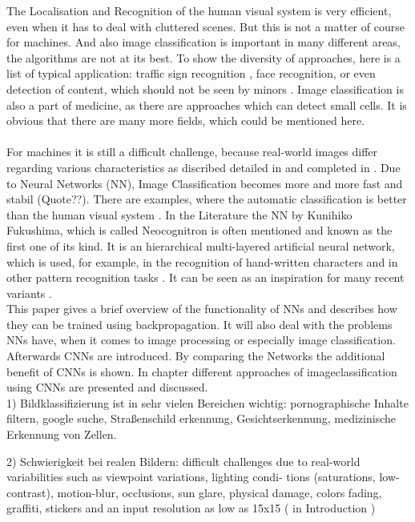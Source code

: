 \documentclass{sig-alternate-05-2015}
\begin{document}
The Localisation and Recognition of the human visual system is very efficient, even when it has to deal with cluttered scenes. But this is not a matter of course for machines. And also image classification is important in many different areas, the algorithms are not at its best. To show the diversity of approaches, here is a list of typical application: traffic sign recognition \cite{6033458}\cite{6033589}, face recognition, or even detection of  content, which should not be seen by minors \cite{7545022}. Image classification is also a part of medicine, as there are approaches which can detect small cells. It is obvious that there are many more fields, which could be mentioned here. \\\\
For machines it is still a difficult challenge, because real-world images differ regarding various characteristics as discribed detailed in \cite{6033589} and completed in \cite{ijcai2011}.
Due to Neural Networks (NN), Image Classification becomes more and more fast and stabil (Quote??). There are examples, where the automatic classification is better than the human visual system \cite{6033458}. 
In the Literature the NN by Kunihiko Fukushima, which is called Neocognitron is often mentioned and known as the first one of its kind. It is an hierarchical multi-layered artificial neural network, which is used, for example, in the recognition of hand-written characters and in other pattern recognition tasks \cite{Fukushima1980}. It can be seen as an inspiration for many recent variants \cite{ijcai2011}.\\
This paper gives a brief overview of the functionality of NNs and describes how they can be trained using backpropagation. It will also deal with the problems NNs have, when it comes to image processing or especially image classification. Afterwards CNNs are introduced. By comparing the Networks the additional benefit of CNNs is shown. In chapter different approaches of imageclassification using CNNs are presented and discussed. 
\\


1) Bildklassifizierung ist in sehr vielen Bereichen wichtig: pornographische Inhalte filtern, google suche, Straßenschild erkennung, Gesichtserkennung, medizinische Erkennung von Zellen. 

2) Schwierigkeit bei realen Bildern: difficult challenges due to real-world variabilities such as viewpoint variations, lighting condi- tions (saturations, low-contrast), motion-blur, occlusions, sun glare, physical damage, colors fading, graffiti, stickers and an input resolution as low as 15x15 (\cite{6033589} in Introduction )
\end{document}

